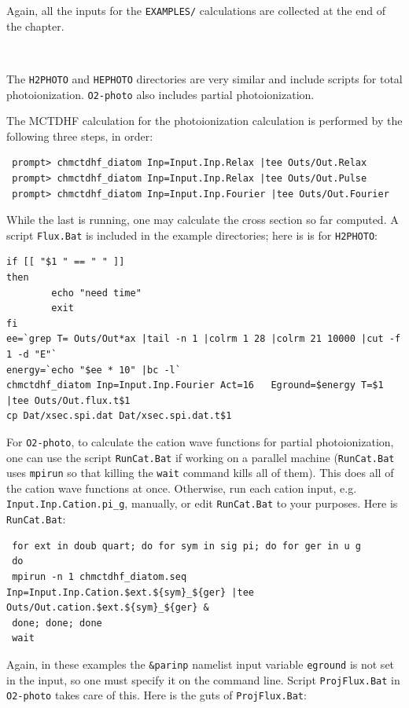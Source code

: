 \documentclass[10pt,leqno, oneside]{book}
\begin{document}
Again, all the inputs for the \verb#EXAMPLES/# calculations are collected at the end of the chapter.  

\

The \verb#H2PHOTO# and \verb#HEPHOTO# directories are very similar and include scripts for total photoionization. 
\verb#O2-photo# also includes partial photoionization.

The MCTDHF calculation for the photoionization calculation is performed by the following three steps, in order:

 {\footnotesize
 \begin{verbatim}
 prompt> chmctdhf_diatom Inp=Input.Inp.Relax |tee Outs/Out.Relax 
 prompt> chmctdhf_diatom Inp=Input.Inp.Relax |tee Outs/Out.Pulse
 prompt> chmctdhf_diatom Inp=Input.Inp.Fourier |tee Outs/Out.Fourier
 \end{verbatim}
}
While the last is running, one may calculate the cross section so far computed.  A script \verb#Flux.Bat# is included in the example
directories; here is is for \verb#H2PHOTO#: 
 {\footnotesize
 \begin{verbatim}
if [[ "$1 " == " " ]]
then
        echo "need time"
        exit
fi
ee=`grep T= Outs/Out*ax |tail -n 1 |colrm 1 28 |colrm 21 10000 |cut -f 1 -d "E"`
energy=`echo "$ee * 10" |bc -l`
chmctdhf_diatom Inp=Input.Inp.Fourier Act=16   Eground=$energy T=$1 |tee Outs/Out.flux.t$1
cp Dat/xsec.spi.dat Dat/xsec.spi.dat.t$1
\end{verbatim}
}

For \verb#O2-photo#, 
to calculate the cation wave functions for partial photoionization, one can use the script \verb#RunCat.Bat# if working
on a parallel machine (\verb#RunCat.Bat# uses \verb#mpirun# so that killing the \verb#wait# command kills all of them).  This does all of the cation wave functions at once.
Otherwise, run each cation input, e.g. \verb#Input.Inp.Cation.pi_g#, manually, or edit \verb#RunCat.Bat# to your purposes.  Here is \verb#RunCat.Bat#:

{\footnotesize
\begin{verbatim}
 for ext in doub quart; do for sym in sig pi; do for ger in u g
 do 
 mpirun -n 1 chmctdhf_diatom.seq Inp=Input.Inp.Cation.$ext.${sym}_${ger} |tee Outs/Out.cation.$ext.${sym}_${ger} & 
 done; done; done
 wait
\end{verbatim}
}
 



Again, in these examples the \verb#&parinp# namelist input variable 
\verb#eground# is not set in the input, so one must specify it on the command line.
Script \verb#ProjFlux.Bat# in \verb#O2-photo# takes care of this.  Here is the guts of \verb#ProjFlux.Bat#:
\end{document}
